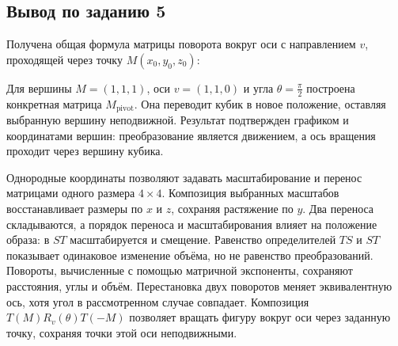 \documentclass[a4paper,14pt]{extarticle}
\begin{document}
\par\noindent\begin{minipage}{\linewidth}
\subsection*{Вывод по заданию 5}

Получена общая формула матрицы поворота вокруг оси с направлением $v$, проходящей через точку $M(x_0,y_0,z_0)$:

\begin{center}\end{center}

Для вершины $M=(1,1,1)$, оси $v=(1,1,0)$ и угла $\theta=\frac{\pi}{2}$ построена конкретная матрица $M_{\text{pivot}}$. Она переводит кубик в новое положение, оставляя выбранную вершину неподвижной. Результат подтвержден графиком и координатами вершин: преобразование является движением, а ось вращения проходит через вершину кубика.
\end{minipage}\par
\clearpage
{}
Однородные координаты позволяют задавать масштабирование и перенос матрицами
одного размера $4\times4$. Композиция выбранных масштабов восстанавливает
размеры по $x$ и $z$, сохраняя растяжение по $y$. Два переноса складываются,
а порядок переноса и масштабирования влияет на положение образа:
в $ST$ масштабируется и смещение. Равенство определителей $TS$ и $ST$
показывает одинаковое изменение объёма, но не равенство преобразований.
Повороты, вычисленные с помощью матричной экспоненты,
сохраняют расстояния, углы и объём. Перестановка двух поворотов меняет
эквивалентную ось, хотя угол в рассмотренном случае совпадает.
Композиция $T(M)R_v(\theta)T(-M)$ позволяет вращать фигуру вокруг оси
через заданную точку, сохраняя точки этой оси неподвижными.
\clearpage
{}
\begingroup{}
\endgroup
\clearpage
{}
\begingroup{}
\endgroup
\end{document}
